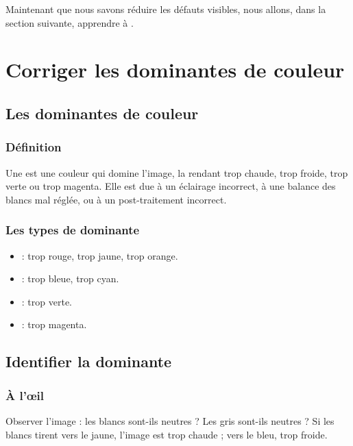 Maintenant que nous savons réduire les défauts visibles, nous allons, dans la section suivante, apprendre à .

\section{Corriger les dominantes de couleur}

\subsection{Les dominantes de couleur}

\subsubsection{Définition}

Une  est une couleur qui domine l'image, la rendant trop chaude, trop froide, trop verte ou trop magenta. Elle est due à un éclairage incorrect, à une balance des blancs mal réglée, ou à un post-traitement incorrect.

\subsubsection{Les types de dominante}

\begin{itemize}
    \item {} : trop rouge, trop jaune, trop orange.
    \item {} : trop bleue, trop cyan.
    \item {} : trop verte.
    \item {} : trop magenta.
\end{itemize}

\subsection{Identifier la dominante}

\subsubsection{À l'œil}

Observer l'image : les blancs sont-ils neutres ? Les gris sont-ils neutres ? Si les blancs tirent vers le jaune, l'image est trop chaude ; vers le bleu, trop froide.

